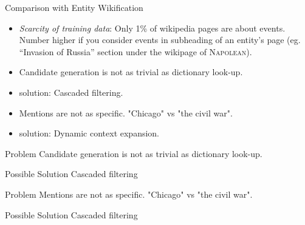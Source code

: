 \begin{frame}{Comparison with Entity Wikification}

  \begin{itemize}[<+->]
  \item \emph{Scarcity of training data}: Only 1\% of wikipedia pages are about events. Number higher if you consider events in subheading of an entity's page (eg. ``Invasion of Russia'' section under the wikipage of \textsc{Napolean}).
  \item Candidate generation is not as trivial as dictionary look-up.
  \item {\color{red}solution:} Cascaded filtering.
  \item Mentions are not as specific. "Chicago" vs "the civil war".
  \item {\color{red}solution:} Dynamic context expansion.
  \end{itemize}
\end{frame}

\begin{frame}

  \begin{block}{Problem}
    Candidate generation is not as trivial as dictionary look-up.
  \end{block}

  \begin{exampleblock}{Possible Solution}
    Cascaded filtering
  \end{exampleblock}

  \begin{block}{Problem}
    Mentions are not as specific. "Chicago" vs "the civil war".
  \end{block}

  \begin{exampleblock}{Possible Solution}
    Cascaded filtering
  \end{exampleblock}
\end{frame}
